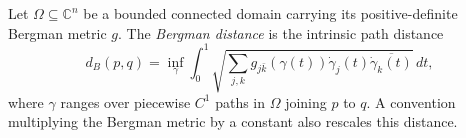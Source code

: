 
Let $\Omega\subseteq\mathbb C^n$ be a bounded connected domain carrying its positive-definite Bergman metric $g$. The \emph{Bergman distance} is the intrinsic path distance
\[
d_B(p,q)=\inf_\gamma\int_0^1\sqrt{\sum_{j,k}g_{j\bar k}(\gamma(t))\dot\gamma_j(t)\overline{\dot\gamma_k(t)}}\,dt,
\]
where $\gamma$ ranges over piecewise $C^1$ paths in $\Omega$ joining $p$ to $q$. A convention multiplying the Bergman metric by a constant also rescales this distance.
